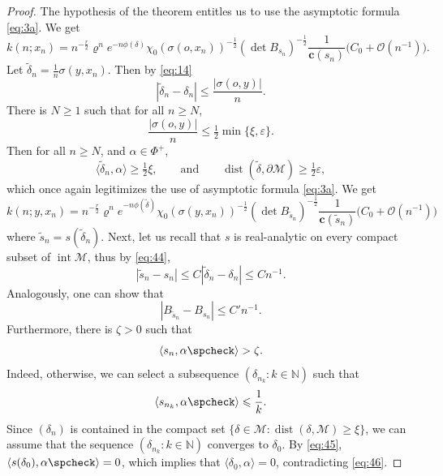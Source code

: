 \documentclass[11pt]{amsart}
\newcommand{\NN}{\mathbb{N}}
\newcommand{\calM}{\mathcal{M}}
\newcommand{\bfc}{\mathbf{c}}
\newcommand{\sprod}[2]{\langle {#1}, {#2} \rangle}
\newcommand{\dist}{\operatorname{dist}}
\newcommand{\inter}{\operatorname{int}}
\theoremstyle{plain}
\theoremstyle{definition}
\numberwithin{equation}{section}
\begin{document}
\begin{proof}
	The hypothesis of the theorem entitles us to use the asymptotic formula \eqref{eq:3a}. We get
	\begin{equation}
		\label{eq:43}
		k(n; x_n) = n^{-\frac{r}2} \varrho^n e^{-n\phi(\delta)} \chi_0(\sigma(o,x_n))^{-\frac{1}{2}} 
		(\det B_{s_n})^{-\frac{1}{2}} \frac{1}{\bfc(s_n)} \Big(C_0 + \mathcal{O}(n^{-1})\Big).
	\end{equation}
	Let $\tilde{\delta}_n = \frac{1}{n} \sigma(y, x_n)$. Then by \eqref{eq:14}
	\begin{equation}
		\label{eq:44}
		|\tilde{\delta}_n - \delta_n| \leqslant \frac{|\sigma(o, y)|}{n}.
	\end{equation}
	There is $N \geqslant 1$ such that for all $n \geqslant N$,
	\[
		\frac{|\sigma(o, y)|}{n} \leqslant \tfrac{1}{2} \min\{\xi, \varepsilon\}.
	\]
	Then for all $n \geqslant N$, and $\alpha \in \Phi^+$,
	\[
		\sprod{\tilde{\delta}_n}{\alpha} \geqslant \tfrac{1}{2} \xi, \qquad \text{and}\qquad
		\dist(\tilde{\delta}, \partial \calM) \geqslant \tfrac{1}{2} \varepsilon,
	\]
	which once again legitimizes the use of asymptotic formula \eqref{eq:3a}. We get
	\begin{equation}
		\label{eq:49}
		k(n; y, x_n) = n^{-\frac{r}2} \varrho^n e^{-n\phi(\tilde{\delta})} \chi_0(\sigma(y, x_n))^{-\frac{1}{2}} 
		(\det B_{\tilde{s}_n})^{-\frac{1}{2}} \frac{1}{\bfc(\tilde{s}_n)} \Big(C_0 + \mathcal{O}(n^{-1})\Big)
	\end{equation}
	where $\tilde{s}_n = s(\tilde{\delta}_n)$. Next, let us recall that $s$ is real-analytic on every compact subset of
	$\inter \calM$, thus by \eqref{eq:44},
	\begin{equation}
		\label{eq:48}
		|\tilde{s}_n - s_n| 
		\leqslant C |\tilde{\delta}_n - \delta_n| \leqslant C n^{-1}.
	\end{equation}
	Analogously, one can show that
	\[
		|B_{\tilde{s}_n} - B_{s_n}| \leqslant C'n^{-1}.
	\]
	Furthermore, there is $\zeta > 0$ such that
	\begin{equation}
		\label{eq:47}
		\sprod{s_n}{\alpha\spcheck} > \zeta.
	\end{equation}
	Indeed, otherwise, we can select a subsequence $(\delta_{n_k} : k \in \NN)$ such that 
	\begin{equation}
		\label{eq:45}
		\sprod{s_{n_k}}{\alpha\spcheck} \leqslant \frac{1}{k}.
	\end{equation}
	Since $(\delta_n)$ is contained in the compact set $\{\delta \in \calM : \dist(\delta, \calM) \geqslant \xi\}$,
	we can assume that the sequence $(\delta_{n_k} : k \in \NN)$ converges to $\delta_0$. By \eqref{eq:45}, 
	$\sprod{s(\delta_0)}{\alpha\spcheck} = 0$, which implies that $\sprod{\delta_0}{\alpha} = 0$,
	contradicting \eqref{eq:46}.


\end{proof}
\end{document}
